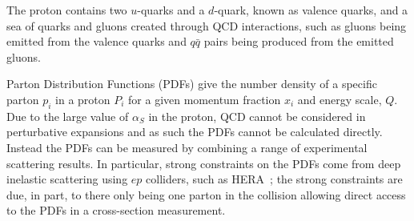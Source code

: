 The proton contains two $u$-quarks and a $d$-quark, known as valence quarks, and a sea of quarks and gluons created
through QCD interactions, such as gluons being emitted from the valence quarks and $q\bar{q}$ pairs being produced from the emitted gluons.

Parton Distribution Functions (PDFs) give the number density of a specific parton $p_i$ in a proton $P_i$
for a given momentum fraction $x_i$ and energy scale, $Q$.
Due to the large value of $\alpha_S$ in the proton, QCD cannot be considered in perturbative expansions and as such the PDFs cannot be calculated directly.
Instead the PDFs can be measured by combining a range of experimental scattering results.
In particular, strong constraints on the PDFs come from deep inelastic scattering using $ep$ colliders, such as HERA~\cite{theo-qcd_hera};
the strong constraints are due, in part, to there only being one parton in the collision allowing direct access to the PDFs in a cross-section measurement.


